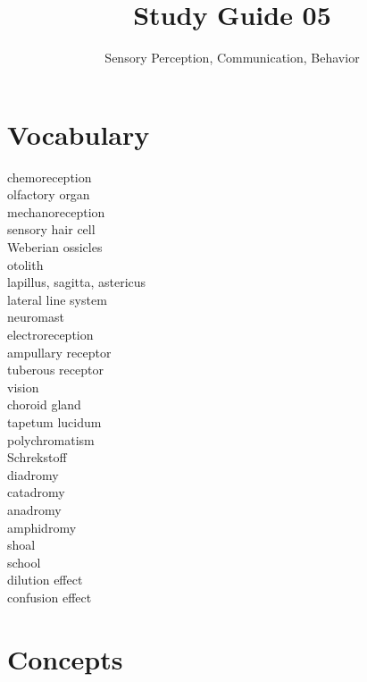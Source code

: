 \documentclass[nofonts, letterpaper]{tufte-handout}
\title{Study Guide 05}
\author{Sensory Perception, Communication, Behavior}
\date{} %
\begin{document}
\maketitle	%


\section{Vocabulary} 
\vspace{-1\baselineskip}
\begin{multicols}{2}
chemoreception \\
olfactory organ \\
mechanoreception \\
sensory hair cell \\
Weberian ossicles \\
otolith \\
lapillus, sagitta, astericus \\
lateral line system \\
neuromast \\
electroreception \\
ampullary receptor \\
tuberous receptor \\
vision \\
choroid gland \\
tapetum lucidum \\
polychromatism \\
Schrekstoff \\
diadromy \\
catadromy \\
anadromy \\
amphidromy \\
shoal \\
school \\
dilution effect \\
confusion effect 
\end{multicols}

\section{Concepts}
\end{document}
